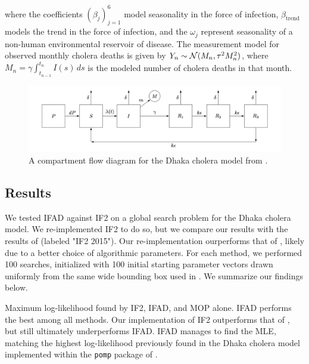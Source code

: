 \documentclass[11pt]{article}
\newcommand\arxiv[2]{#1} %
\begin{document}
where the coefficients $(\beta_j)_{j=1}^6$ model seasonality in the force of infection, $\beta_{\text{trend}}$ models the trend in the force of infection, and the $\omega_j$ represent seasonality of a non-human environmental reservoir of disease.
The measurement model for observed monthly cholera deaths is given by 
    $Y_n \sim {\mathcal{N}}(M_n, \tau^2M_n^2)$,
where $M_n=\gamma\int_{t_{n-1}}^{t_n}I(s)\, ds$ is the modeled number of cholera deaths in that month.


\begin{figure}
    \centering
    \includegraphics[width=\arxiv{14cm}{\textwidth/2}]{../imgs/095/tikzcholera.png}
    \vspace*{-7mm}
    \caption{A compartment flow diagram for the Dhaka cholera model from \cite{king08}.}
    \label{fig:tikz-cholera}
\end{figure}

\subsection{Results}

We tested IFAD against IF2 on a global search problem for the Dhaka cholera model.
We re-implemented IF2 to do so, but we compare our results with the results of \cite{ionides15} (labeled "IF2 2015").
Our re-implementation ourperforms that of \cite{ionides15}, likely due to a better choice of algorithmic parameters.
For each method, we performed 100 searches, initialized with 100 initial starting parameter vectors drawn uniformly from the same wide bounding box used in \cite{ionides15}. We summarize our findings below. 

  
\begin{table}[h!]
\centering

\caption{Maximum log-likelihood found by IF2, IFAD, and MOP alone. IFAD performs the best among all methods. Our implementation of IF2 outperforms that of \cite{ionides15}, but still ultimately underperforms IFAD. IFAD manages to find the MLE, matching the highest log-likelihood previously found in the Dhaka cholera model implemented within the \texttt{pomp} package of \cite{king16}.}
\label{table:mle}
\end{table}
\end{document}

